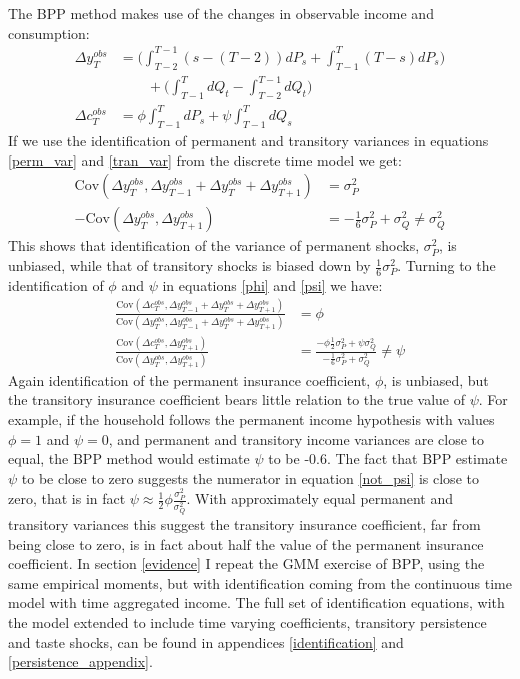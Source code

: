 The BPP method makes use of the changes in observable income and consumption:
\begin{align}
\Delta y^{obs}_T &=  \Big(\int_{T-2}^{T-1} (s-(T-2))dP_s  + \int_{T-1}^{T} (T-s)dP_s \Big) \nonumber \\
& \qquad + \Big(\int_{T-1}^{T} dQ_t -\int_{T-2}^{T-1} dQ_t \Big) \label{deltay} \\
\Delta c^{obs}_T &= \phi  \int_{T-1}^{T} dP_s  +\psi \int_{T-1}^{T}dQ_s  \label{deltac}
\end{align}
If we use the identification of permanent and transitory variances in equations \ref{perm_var} and \ref{tran_var} from the discrete time model we get:
\begin{align*}
\mathrm{Cov}(\Delta y^{obs}_{T}, \Delta y^{obs}_{T-1}+\Delta y^{obs}_{T}+\Delta y^{obs}_{T+1}) &= \sigma^2_P\\
-\mathrm{Cov}(\Delta y^{obs}_{T},\Delta y^{obs}_{T+1}) &= -\frac{1}{6}\sigma^2_P + \sigma^2_Q \neq \sigma^2_Q
\end{align*}
This shows that identification of the variance of permanent shocks, $\sigma^2_P$, is unbiased, while that of transitory shocks is biased down by $\frac{1}{6}\sigma^2_P$. Turning to the identification of $\phi$ and $\psi$ in equations \ref{phi} and \ref{psi} we have:
\begin{align}
\frac{\mathrm{Cov}(\Delta c^{obs}_{T}, \Delta y^{obs}_{T-1}+\Delta y^{obs}_{T}+\Delta y^{obs}_{T+1})}{\mathrm{Cov}(\Delta y^{obs}_{T}, \Delta y^{obs}_{T-1}+\Delta y^{obs}_{T}+\Delta y^{obs}_{T+1})}&= \phi\\
\frac{\mathrm{Cov}(\Delta c^{obs}_{T},\Delta y^{obs}_{T+1})}{\mathrm{Cov}(\Delta y^{obs}_{T},\Delta y^{obs}_{T+1})} &= \frac{-\phi\frac{1}{2}\sigma^2_P + \psi\sigma^2_Q}{-\frac{1}{6}\sigma^2_P + \sigma^2_Q} \neq \psi \label{not_psi}
\end{align}
Again identification of the permanent insurance coefficient, $\phi$, is unbiased, but the transitory insurance coefficient bears little relation to the true value of $\psi$. For example, if the household follows the permanent income hypothesis with values $\phi=1$ and $\psi=0$, and permanent and transitory income variances are close to equal, the BPP method would estimate $\psi$ to be -0.6. The fact that BPP estimate $\psi$ to be close to zero suggests the numerator in equation \ref{not_psi} is close to zero, that is in fact $\psi \approx \frac{1}{2}\phi \frac{\sigma^2_P}{\sigma^2_Q}$. With approximately equal permanent and transitory variances this suggest the transitory insurance coefficient, far from being close to zero, is in fact about half the value of the permanent insurance coefficient. In section \ref{evidence} I repeat the GMM exercise of BPP, using the same empirical moments, but with identification coming from the continuous time model with time aggregated income. The full set of identification equations, with the model extended to include time varying coefficients, transitory persistence and taste shocks, can be found in appendices \ref{identification} and \ref{persistence_appendix}.

